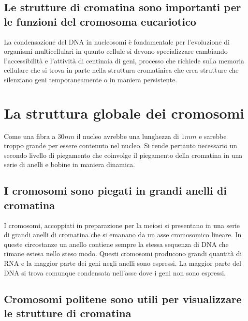 \subsection{Le strutture di cromatina sono importanti per le funzioni del cromosoma eucariotico}
La condensazione del DNA in nucleosomi \`e fondamentale per l'evoluzione di organismi multicellulari in quanto cellule si devono specializzare cambiando l'accessibilit\`a e l'attivit\`a
di centinaia di geni, processo che richiede sulla memoria cellulare che si trova in parte nella struttura cromatinica che crea strutture che silenziano geni temporaneamente o in 
maniera persistente.
\section{La struttura globale dei cromosomi}
Come una fibra a $30nm$ il nucleo avrebbe una lunghezza di $1mm$ e sarebbe troppo grande per essere contenuto nel nucleo. Si rende pertanto necessario un secondo livello di piegamento
che coinvolge il piegamento della cromatina in una serie di anelli e bobine in maniera dinamica.
\subsection{I cromosomi sono piegati in grandi anelli di cromatina}
I cromosomi, accoppiati in preparazione per la meiosi si presentano in una serie di grandi anelli di cromatina che si emanano da un asse cromosomico lineare. In queste circostanze un
anello contiene sempre la stessa sequenza di DNA che rimane estesa nello steso modo. Questi cromosomi producono grandi quantit\`a di RNA e la maggior parte dei geni negli anelli sono
espressi. La maggior parte del DNA si trova comunque condensata nell'asse dove i geni non sono espressi. 
\subsection{Cromosomi politene sono utili per visualizzare le strutture di cromatina}

